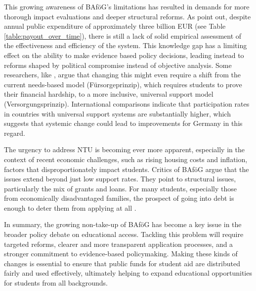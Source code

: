This growing awareness of BAföG’s limitations has resulted in demands for more thorough impact evaluations and deeper structural reforms. As \cite{meier_bafog_2024} point out, despite annual public expenditure of approximately three billion EUR (see Table \ref{table:payout_over_time}), there is still a lack of solid empirical assessment of the effectiveness and efficiency of the system. This knowledge gap has a limiting effect on the ability to make evidence based policy decisions, leading instead to reforms shaped by political compromise instead of objective analysis. Some researchers, like \cite{gwosc_krisenbewaltigung_2022}, argue that changing this might even require a shift from the current needs-based model (Fürsorgeprinzip), which requires students to prove their financial hardship, to a more inclusive, universal support model (Versorgungsprinzip). International comparisons indicate that participation rates in countries with universal support systems are substantially higher, which suggests that systemic change could lead to improvements for Germany in this regard.

The urgency to address NTU is becoming ever more apparent, especially in the context of recent economic challenges, such as rising housing costs and inflation, factors that disproportionately impact students. Critics of BAföG argue that the issues extend beyond just low support rates. They point to structural issues, particularly the mix of grants and loans. For many students, especially those from economically disadvantaged families, the prospect of going into debt is enough to deter them from applying at all \citep{staack_von_2017, gwosc_krisenbewaltigung_2022}.


In summary, the growing non-take-up of BAföG has become a key issue in the broader policy debate on educational access. 
Tackling this problem will require targeted reforms, clearer and more transparent application processes, and a stronger commitment to evidence-based policymaking. 
Making these kinds of changes is essential to ensure that public funds for student aid are distributed fairly and used effectively, ultimately helping to expand educational opportunities for students from all backgrounds.

